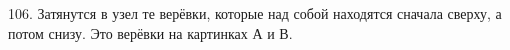106. Затянутся в узел те верёвки, которые над собой находятся сначала сверху, а потом снизу. Это верёвки на картинках А и В.\\
